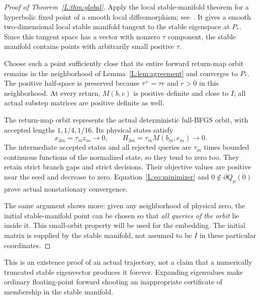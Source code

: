 \documentclass[10pt,oneside,openany]{book}
\theoremstyle{remark}\newtheorem{remark}{Remark}[chapter]
\begin{document}
\begin{proof}[Proof of Theorem~\ref{L:thm:global}]
Apply the local stable-manifold theorem for a hyperbolic fixed point of a smooth local diffeomorphism; see~\cite[Sections 3--4]{DY}. It gives a smooth two-dimensional local stable manifold tangent to the stable eigenspace at $P_*$. Since this tangent space has a vector with nonzero $\tau$ component, the stable manifold contains points with arbitrarily small positive $\tau$.

Choose such a point sufficiently close that its entire forward return-map orbit remains in the neighborhood of Lemma~\ref{L:lem:agreement} and converges to $P_*$. The positive half-space is preserved because $\tau^+=\tau r$ and $r>0$ in this neighborhood. At every return, $M(b,e)$ is positive definite and close to $I$; all actual substep matrices are positive definite as well.

The return-map orbit represents the actual deterministic full-BFGS orbit, with accepted lengths $1,1/4,1/16$. Its physical states satisfy
\[
 x_{3m}=\tau_m z_m\to0,\qquad H_{3m}=\tau_mM(b_m,e_m)\to0.
\]
The intermediate accepted states and all rejected queries are $\tau_m$ times bounded continuous functions of the normalized state, so they tend to zero too. They retain strict branch gaps and strict decisions. Their objective values are positive near the seed and decrease to zero. Equation~\eqref{L:eq:minimizer} and $0\notin\partial Q_\mu(0)$ prove actual nonstationary convergence.

The same argument shows more: given any neighborhood of physical zero, the initial stable-manifold point can be chosen so that \emph{all queries of the orbit} lie inside it. This small-orbit property will be used for the embedding. The initial matrix is supplied by the stable manifold, not assumed to be $I$ in these particular coordinates.
\end{proof}
\noindent This is an existence proof of an actual trajectory, not a claim that a numerically truncated stable eigenvector produces it forever. Expanding eigenvalues make ordinary floating-point forward shooting an inappropriate certificate of membership in the stable manifold.


\setcounter{section}{4}
\setcounter{theorem}{2}
\setcounter{lemma}{1}
\setcounter{corollary}{0}
\setcounter{proposition}{0}
\setcounter{remark}{0}
\setcounter{equation}{4}
\end{document}
